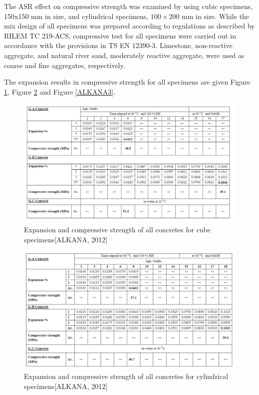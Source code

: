 The ASR effect on compressive strength was examined by using cubic specimens, 150x150 mm in size, and cylindrical specimens, $100 \times 200$ mm in size. While the mix design of all specimens was prepared according to regulations as described by RILEM TC 219-ACS, compressive test for all specimens were carried out in accordance with the provisions in TS EN 12390-3. Limestone, non-reactive aggregate, and natural river sand, moderately reactive aggregate, were used as coarse and fine aggregates, respectively.

The expansion results in compressive strength for all specimens are given Figure \ref{ALKANA1}, Figure \ref{ALKANA2} and Figure \ref{ALKANA3}.

\begin{figure}[h!]
  \centering
  \includegraphics[width=1.0\linewidth]{Reference/ALKANASR1.png}
  \caption{Expansion and compressive strength of all concretes for cube specimens[ALKANA, 2012\cite{ALKANA}]}
  \label{ALKANA1}
\end{figure}

\begin{figure}[h!]
  \centering
  \includegraphics[width=1.0\linewidth]{Reference/ALKANASR2.png}
  \caption{Expansion and compressive strength of all concretes for cylindrical specimens[ALKANA, 2012\cite{ALKANA}]}
  \label{ALKANA2}
\end{figure}

